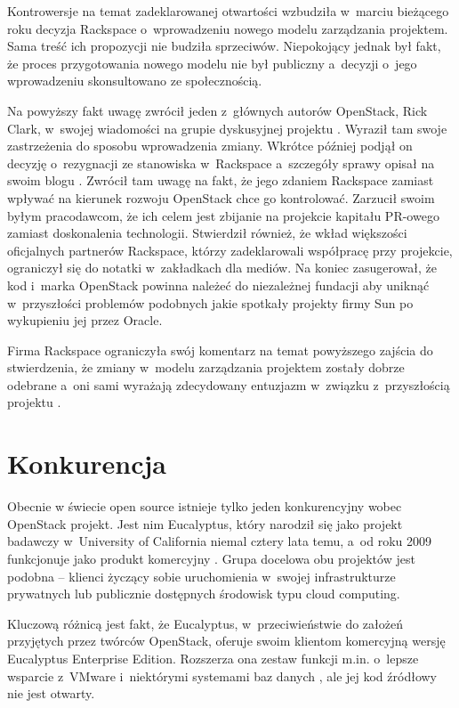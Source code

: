 	Kontrowersje na temat zadeklarowanej otwartości wzbudziła w~marciu bieżącego
	roku decyzja Rackspace o~wprowadzeniu nowego modelu zarządzania projektem.
	Sama treść ich propozycji nie budziła sprzeciwów. Niepokojący jednak był
	fakt, że proces przygotowania nowego modelu nie był publiczny a~decyzji
	o~jego wprowadzeniu skonsultowano ze społecznością.

	Na powyższy fakt uwagę zwrócił jeden z~głównych autorów OpenStack, Rick
	Clark, w~swojej wiadomości na grupie dyskusyjnej projektu
	\cite{clark_list_msg}. Wyraził tam swoje zastrzeżenia do sposobu
	wprowadzenia zmiany. Wkrótce później podjął on decyzję o~rezygnacji ze
	stanowiska w~Rackspace a~szczegóły sprawy opisał na swoim blogu
	\cite{why_i_left_rackspace}. Zwrócił tam uwagę na fakt, że jego zdaniem
	Rackspace zamiast wpływać na kierunek rozwoju OpenStack chce go kontrolować.
	Zarzucił swoim byłym pracodawcom, że ich celem jest zbijanie na projekcie
	kapitału PR-owego zamiast doskonalenia technologii. Stwierdził również, że
	wkład większości oficjalnych partnerów Rackspace, którzy zadeklarowali
	współpracę przy projekcie, ograniczył się do notatki w~zakładkach dla
	mediów. Na koniec zasugerował, że kod i~marka OpenStack powinna należeć do
	niezależnej fundacji aby uniknąć w~przyszłości problemów podobnych jakie
	spotkały projekty firmy Sun po wykupieniu jej przez Oracle.

	Firma Rackspace ograniczyła swój komentarz na temat powyższego zajścia do
	stwierdzenia, że zmiany w~modelu zarządzania projektem zostały dobrze
	odebrane a~oni sami wyrażają zdecydowany entuzjazm w~związku z~przyszłością
	projektu \cite{concerns_about_openness}.

	\section{Konkurencja}

	Obecnie w świecie open source istnieje tylko jeden konkurencyjny wobec
	OpenStack projekt. Jest nim Eucalyptus, który narodził się jako projekt
	badawczy w~University of California niemal cztery lata temu, a~od roku 2009
	funkcjonuje jako produkt komercyjny \cite{openstack_vs_euca}. Grupa docelowa
	obu projektów jest podobna -- klienci życzący sobie uruchomienia w~swojej
	infrastrukturze prywatnych lub publicznie dostępnych środowisk typu cloud
	computing.

	Kluczową różnicą jest fakt, że Eucalyptus, w~przeciwieństwie do założeń
	przyjętych przez twórców OpenStack, oferuje swoim klientom komercyjną wersję
	Eucalyptus Enterprise Edition. Rozszerza ona zestaw funkcji m.in. o~lepsze
	wsparcie z~VMware i~niektórymi systemami baz danych
	\cite{openstack_vs_euca}, ale jej kod źródłowy nie jest otwarty.

